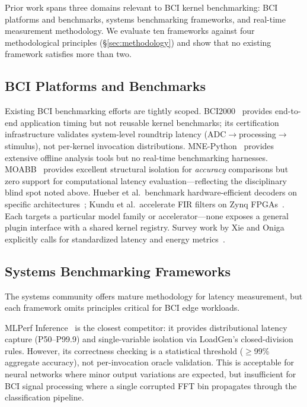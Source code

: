 \documentclass[sigplan,10pt]{acmart}
\begin{document}
Prior work spans three domains relevant to BCI kernel benchmarking: BCI platforms and benchmarks, systems benchmarking frameworks, and real-time measurement methodology. We evaluate ten frameworks against four methodological principles (\S\ref{sec:methodology}) and show that no existing framework satisfies more than two.

\subsection{BCI Platforms and Benchmarks}

Existing BCI benchmarking efforts are tightly scoped. BCI2000~\cite{schalk2004bci2000} provides end-to-end application timing but not reusable kernel benchmarks; its certification infrastructure validates system-level roundtrip latency (ADC$\to$processing$\to$stimulus), not per-kernel invocation distributions. MNE-Python~\cite{gramfort2014mne} provides extensive offline analysis tools but no real-time benchmarking harnesses. MOABB~\cite{jayaram2018moabb} provides excellent structural isolation for \emph{accuracy} comparisons but zero support for computational latency evaluation---reflecting the disciplinary blind spot noted above. Hueber et al.\ benchmark hardware-efficient decoders on specific architectures~\cite{hueber2024decoder}; Kundu et al.\ accelerate FIR filters on Zynq FPGAs~\cite{kundu2024fpga}. Each targets a particular model family or accelerator---none exposes a general plugin interface with a shared kernel registry. Survey work by Xie and Oniga explicitly calls for standardized latency and energy metrics~\cite{xie2024survey}.

\subsection{Systems Benchmarking Frameworks}

The systems community offers mature methodology for latency measurement, but each framework omits principles critical for BCI edge workloads.

MLPerf Inference~\cite{reddi2020mlperf} is the closest competitor: it provides distributional latency capture (P50--P99.9) and single-variable isolation via LoadGen's closed-division rules. However, its correctness checking is a statistical threshold ($\geq$99\% aggregate accuracy), not per-invocation oracle validation. This is acceptable for neural networks where minor output variations are expected, but insufficient for BCI signal processing where a single corrupted FFT bin propagates through the classification pipeline.
\end{document}
